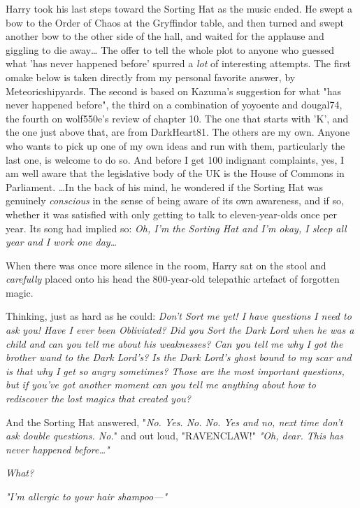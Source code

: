 Harry took his last steps toward the Sorting Hat as the music ended. He swept a 
bow to the Order of Chaos at the Gryffindor table, and then turned and swept 
another bow to the other side of the hall, and waited for the applause and 
giggling to die away{\ldots}
\sbreak
The offer to tell the whole plot to anyone who guessed what 'has never happened 
before' spurred a \emph{lot} of interesting attempts. The first omake below is 
taken directly from my personal favorite answer, by Meteoricshipyards. The 
second is based on Kazuma's suggestion for what "has never happened before", 
the third on a combination of yoyoente and dougal74, the fourth on wolf550e's 
review of chapter 10. The one that starts with 'K', and the one just above 
that, are from DarkHeart81. The others are my own. Anyone who wants to pick up 
one of my own ideas and run with them, particularly the last one, is welcome to 
do so. And before I get 100 indignant complaints, yes, I am well aware that the 
legislative body of the UK is the House of Commons in Parliament.
\sbreak
{\ldots}In the back of his mind, he wondered if the Sorting Hat was genuinely 
\emph{conscious} in the sense of being aware of its own awareness, and if so, 
whether it was satisfied with only getting to talk to eleven-year-olds once per 
year. Its song had implied so: \emph{Oh, I'm the Sorting Hat and I'm okay, I 
sleep all year and I work one day{\ldots}}

When there was once more silence in the room, Harry sat on the stool and 
\emph{carefully} placed onto his head the 800-year-old telepathic artefact of 
forgotten magic.

Thinking, just as hard as he could: \emph{Don't Sort me yet! I have questions I 
need to ask you! Have I ever been Obliviated? Did you Sort the Dark Lord when 
he was a child and can you tell me about his weaknesses? Can you tell me why I 
got the brother wand to the Dark Lord's? Is the Dark Lord's ghost bound to my 
scar and is that why I get so angry sometimes? Those are the most important 
questions, but if you've got another moment can you tell me anything about how 
to rediscover the lost magics that created you?}

And the Sorting Hat answered, "\emph{No. Yes. No. No. Yes and no, next time 
don't ask double questions. No.}" and out loud, "RAVENCLAW!"
\sbreak
\emph{"Oh, dear. This has never happened before{\ldots}"}

\emph{What?}

\emph{"I'm allergic to your hair shampoo---"}

